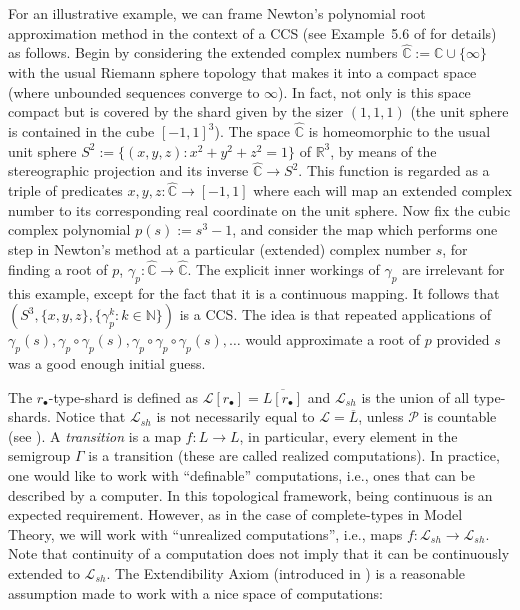 \documentclass[psamsfonts]{amsart}
\theoremstyle{definition}
\theoremstyle{remark}
\numberwithin{equation}{section}
\begin{document}
For an illustrative example, we can frame Newton's polynomial root approximation method in the context of a CCS (see Example~5.6 of \cite{alva2024approximability} for details) as follows. Begin by considering the extended complex numbers $\hat{\mathbb{C}}:=\mathbb{C}\cup\{\infty\}$ with the usual Riemann sphere topology that makes it into a compact space (where unbounded sequences converge to $\infty$). In fact, not only is this space compact but is covered by the shard given by the sizer $(1,1,1)$ (the unit sphere is contained in the cube $[-1,1]^3$). The space $\hat{\mathbb{C}}$ is homeomorphic to the usual unit sphere $S^2:=\{(x,y,z):x^2+y^2+z^2=1\}$ of $\mathbb R^3$, by means of the stereographic projection and its inverse $\hat{\mathbb{C}}\to S^2$. This function is regarded as a triple of predicates $x,y,z:\hat{\mathbb{C}}\to[-1,1]$ where each will map an extended complex number to its corresponding real coordinate on the unit sphere. Now fix the cubic complex polynomial $p(s):=s^3-1$, and consider the map which performs one step in Newton's method at a particular (extended) complex number $s$, for finding a root of $p$, $\gamma_p:\hat{\mathbb{C}}\to\hat{\mathbb{C}}$. The explicit inner workings of $\gamma_p$ are irrelevant for this example, except for the fact that it is a continuous mapping. It follows that $(S^3,\{x,y,z\},\{\gamma_p^k:k\in\mathbb N\})$ is a CCS. The idea is that repeated applications of $\gamma_p(s), \gamma_p\circ\gamma_p(s), \gamma_p\circ\gamma_p\circ\gamma_p(s),\dots$ would approximate a root of $p$ provided $s$ was a good enough initial guess.

The $r_{\bullet}$-type-shard is defined as $\mathcal{L}[r_\bullet]=\overline{L[r_\bullet]}$ and $\mathcal{L}_{sh}$ is the union of all type-shards. Notice that $\mathcal{L}_{sh}$ is not necessarily equal to $\mathcal{L}=\overline{L}$, unless $\mathcal{P}$ is countable (see \cite{alva2024approximability}). A \emph{transition} is a map $f:L\rightarrow L$, in particular, every element in the semigroup $\Gamma$ is a transition (these are called realized computations). In practice, one would like to work with ``definable'' computations, i.e., ones that can be described by a computer. In this topological framework, being continuous is an expected requirement. However, as in the case of complete-types in Model Theory, we will work with ``unrealized computations'', i.e., maps $f:\mathcal{L}_{sh}\rightarrow\mathcal{L}_{sh}$. Note that continuity of a computation does not imply that it can be continuously extended to $\mathcal{L}_{sh}$. The Extendibility Axiom (introduced in \cite{alva2024approximability}) is a reasonable assumption made to work with a nice space of computations:
\end{document}
